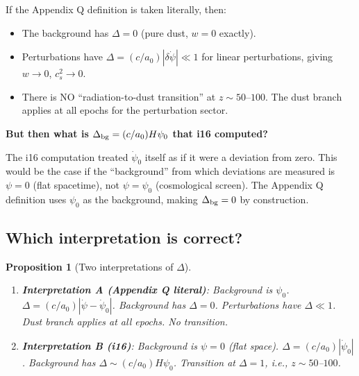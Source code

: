 \documentclass[11pt]{article}
\newtheorem{proposition}{Proposition}
\begin{document}
If the Appendix Q definition is taken literally, then:
\begin{itemize}[nosep]
\item The background has $\Delta = 0$ (pure dust, $w = 0$ exactly).
\item Perturbations have $\Delta = (c/a_0)|\delta\dot\psi| \ll 1$
  for linear perturbations, giving $w \to 0$, $c_s^2 \to 0$.
\item There is NO ``radiation-to-dust transition'' at $z \sim 50$--$100$.
  The dust branch applies at all epochs for the perturbation sector.
\end{itemize}

\textbf{But then what is $\Delta_{\rm bg} = (c/a_0)H\psi_0$ that i16 computed?}

The i16 computation treated $\dot\psi_0$ itself as if it were a deviation
from zero. This would be the case if the ``background'' from which
deviations are measured is $\psi = 0$ (flat spacetime), not $\psi = \psi_0$
(cosmological screen). The Appendix Q definition uses $\psi_0$ as the
background, making $\Delta_{\rm bg} = 0$ by construction.

\subsection{Which interpretation is correct?}

\begin{proposition}[Two interpretations of $\Delta$]
\label{prop:delta-interp}
\hfill
\begin{enumerate}
\item \textbf{Interpretation A (Appendix Q literal)}: Background is $\psi_0$.
  $\Delta = (c/a_0)|\dot\psi - \dot\psi_0|$. Background has $\Delta = 0$.
  Perturbations have $\Delta \ll 1$. Dust branch applies at all epochs.
  No transition.

\item \textbf{Interpretation B (i16)}: Background is $\psi = 0$ (flat space).
  $\Delta = (c/a_0)|\dot\psi_0|$. Background has $\Delta \sim (c/a_0)H\psi_0$.
  Transition at $\Delta = 1$, i.e., $z \sim 50$--$100$.
\end{enumerate}
\end{proposition}
\end{document}

